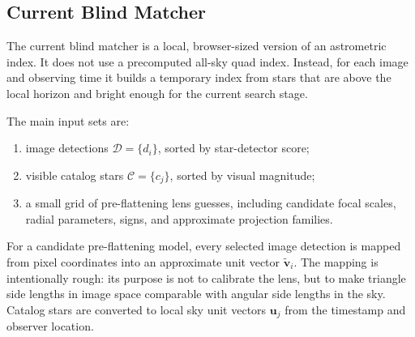 \documentclass[11pt]{article}
\begin{document}
\subsection{Current Blind Matcher}

The current blind matcher is a local, browser-sized version of an astrometric
index. It does not use a precomputed all-sky quad index. Instead, for each
image and observing time it builds a temporary index from stars that are above
the local horizon and bright enough for the current search stage.

The main input sets are:
\begin{enumerate}
  \item image detections \(\mathcal{D}=\{d_i\}\), sorted by star-detector
        score;
  \item visible catalog stars \(\mathcal{C}=\{c_j\}\), sorted by visual
        magnitude;
  \item a small grid of pre-flattening lens guesses, including candidate
        focal scales, radial parameters, signs, and approximate projection
        families.
\end{enumerate}
For a candidate pre-flattening model, every selected image detection is mapped
from pixel coordinates into an approximate unit vector
\(\tilde{\mathbf{v}}_i\). The mapping is intentionally rough: its purpose is
not to calibrate the lens, but to make triangle side lengths in image space
comparable with angular side lengths in the sky. Catalog stars are converted to
local sky unit vectors \(\mathbf{u}_j\) from the timestamp and observer
location.
\end{document}

